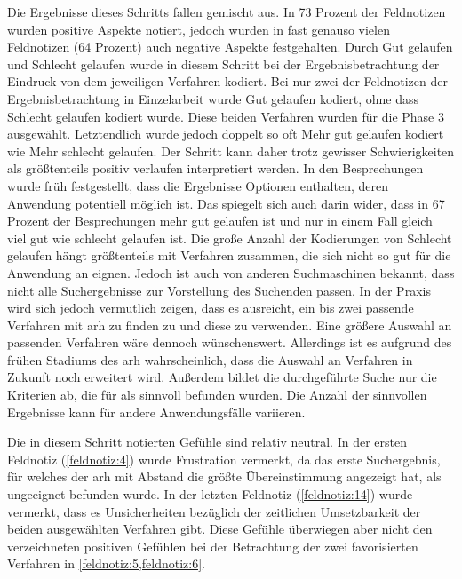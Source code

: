 Die Ergebnisse dieses Schritts fallen gemischt aus.
In 73 Prozent der Feldnotizen wurden positive Aspekte notiert, jedoch wurden in fast genauso vielen Feldnotizen (64 Prozent) auch negative Aspekte festgehalten.
Durch \glqq Gut gelaufen\grqq{} und \glqq Schlecht gelaufen\grqq{} wurde in diesem Schritt bei der Ergebnisbetrachtung der Eindruck von dem jeweiligen Verfahren kodiert. 
Bei nur zwei der Feldnotizen der Ergebnisbetrachtung in Einzelarbeit wurde \glqq Gut gelaufen\grqq{} kodiert, ohne dass \glqq Schlecht gelaufen\grqq{} kodiert wurde.
Diese beiden Verfahren wurden für die Phase 3 ausgewählt.
Letztendlich wurde jedoch doppelt so oft \glqq Mehr gut gelaufen\grqq{} kodiert wie \glqq Mehr schlecht gelaufen\grqq{}.
Der Schritt kann daher trotz gewisser Schwierigkeiten als größtenteils positiv verlaufen interpretiert werden.
In den Besprechungen wurde früh festgestellt, dass die Ergebnisse Optionen enthalten, deren Anwendung potentiell möglich ist.
Das spiegelt sich auch darin wider, dass in 67 Prozent der Besprechungen mehr gut gelaufen ist und nur in einem Fall gleich viel gut wie schlecht gelaufen ist.
Die große Anzahl der Kodierungen von \glqq Schlecht gelaufen\grqq{} hängt größtenteils mit Verfahren zusammen, die sich nicht so gut für die Anwendung an \jf eignen.
Jedoch ist auch von anderen Suchmaschinen bekannt, dass nicht alle Suchergebnisse zur Vorstellung des Suchenden passen.
In der Praxis wird sich jedoch vermutlich zeigen, dass es ausreicht, ein bis zwei passende Verfahren mit \gls{arh} zu finden zu und diese zu verwenden.
Eine größere Auswahl an passenden Verfahren wäre dennoch wünschenswert.
Allerdings ist es aufgrund des frühen Stadiums des \gls{arh} wahrscheinlich, dass die Auswahl an Verfahren in Zukunft noch erweitert wird.
Außerdem bildet die durchgeführte Suche nur die Kriterien ab, die für \jf als sinnvoll befunden wurden.
Die Anzahl der sinnvollen Ergebnisse kann für andere Anwendungsfälle variieren.

Die in diesem Schritt notierten Gefühle sind relativ neutral.
In der ersten Feldnotiz (\cref{feldnotiz:4}) wurde Frustration vermerkt, da das erste Suchergebnis, für welches der \gls{arh} mit Abstand die größte Übereinstimmung angezeigt hat, als ungeeignet befunden wurde.
In der letzten Feldnotiz (\cref{feldnotiz:14}) wurde vermerkt, dass es Unsicherheiten bezüglich der zeitlichen Umsetzbarkeit der beiden ausgewählten Verfahren gibt.
Diese Gefühle überwiegen aber nicht den verzeichneten positiven Gefühlen bei der Betrachtung der zwei favorisierten Verfahren in \cref{feldnotiz:5,feldnotiz:6}.

